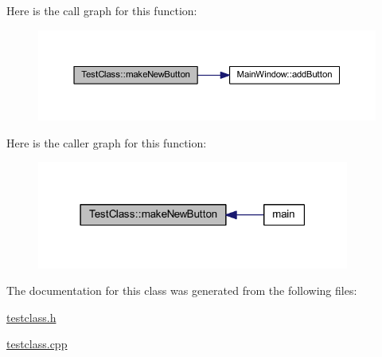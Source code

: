Here is the call graph for this function\+:
\nopagebreak
\begin{figure}[H]
\begin{center}
\leavevmode
\includegraphics[width=350pt]{class_test_class_ab263a6dea1c83b8206d4fc029f4294fd_cgraph}
\end{center}
\end{figure}
Here is the caller graph for this function\+:
\nopagebreak
\begin{figure}[H]
\begin{center}
\leavevmode
\includegraphics[width=291pt]{class_test_class_ab263a6dea1c83b8206d4fc029f4294fd_icgraph}
\end{center}
\end{figure}


The documentation for this class was generated from the following files\+:\begin{DoxyCompactItemize}
\item 
\mbox{\hyperlink{testclass_8h}{testclass.\+h}}\item 
\mbox{\hyperlink{testclass_8cpp}{testclass.\+cpp}}\end{DoxyCompactItemize}

